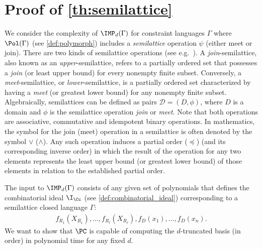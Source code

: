\documentclass[11pt]{article}
\begin{document}
\section{Proof of \cref{th:semilattice} }\label{sect:semilattice-proof}
We consider the complexity of $\IMP_d(\Gamma)$ for constraint languages $\Gamma$ where $\Pol(\Gamma)$ (see \cref{def:polymorph}) includes a \emph{semilattice} operation $\psi$ (either meet or join). 
There are two kinds of semilattice operations (see e.g.~\cite{Davey_Priestley_2002}). A \emph{join}-semilattice, also known as an \emph{upper}-semilattice, refers to a partially ordered set that possesses a \emph{join} (or least upper bound) for every nonempty finite subset. Conversely, a \emph{meet}-semilattice, or \emph{lower}-semilattice, is a partially ordered set characterized by having a \emph{meet} (or greatest lower bound) for any nonempty finite subset. %
%
Algebraically, semilattices can be defined {as pairs $\mathcal{D} = (D,\phi)$, where $D$ is a domain and $\phi$ is the semilattice operation \textit{join} or \textit{meet}. Note that both operations are associative, commutative and idempotent binary operations.} 
In mathematics, the symbol for the join (meet) operation in a semilattice is often denoted by the symbol $\vee$ ($\wedge$).
%
Any such operation induces a partial order ($\preceq$) (and its corresponding inverse order) in which the result of the operation for any two elements represents the least upper bound (or greatest lower bound) of those elements in relation to the established partial order.


The input to $\IMP_d(\Gamma)$ consists of any given set of polynomials that defines the combinatorial ideal $\I_\Cc$ (see \cref{def:combinatorial_ideal}) corresponding to a semilattice closed language $\Gamma$: 
\begin{align}\label{eqn:polynomial_constraints_CSPs}
    f_{R_1}(X_{R_1}),\ldots,f_{R_\ell}(X_{R_\ell}),f_D(x_1),\ldots,f_D(x_n).
\end{align} We want to show that $\PC$ is capable of computing the $d$-truncated \GB basis (in \grlex order) in polynomial time for any fixed $d$.
\end{document}

